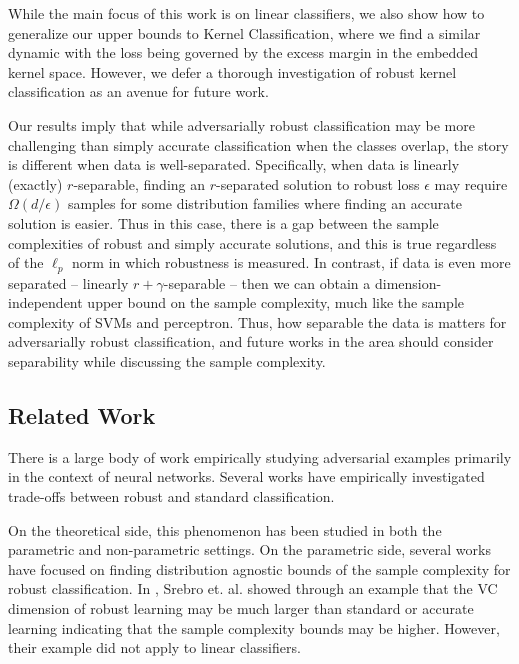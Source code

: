 While the main focus of this work is on linear classifiers, we also show how to generalize our upper bounds to Kernel Classification, where we find a similar dynamic with the loss being governed by the excess margin in the embedded kernel space. However, we defer a thorough investigation of robust kernel classification as an avenue for future work.

Our results imply that while adversarially robust classification may be more challenging than simply accurate classification when the classes overlap, the story is different when data is well-separated. Specifically, when data is linearly (exactly) $r$-separable, finding an $r$-separated solution to robust loss $\epsilon$ may require $\Omega(d/\epsilon)$ samples for some distribution families where finding an accurate solution is easier. Thus in this case, there is a gap between the sample complexities of robust and simply accurate solutions, and this is true regardless of the $\ell_p$ norm in which robustness is measured. In contrast, if data is even more separated -- linearly $r + \gamma$-separable --  then we can obtain a dimension-independent upper bound on the sample complexity, much like the sample complexity of SVMs and perceptron. Thus, how separable the data is matters for adversarially robust classification, and future works in the area should consider separability while discussing the sample complexity.

\subsection{Related Work}

There is a large body of work \cite{Carlini17, Liu17, Papernot17, Papernot16, Szegedy14, Hein17, Katz17, Wu16,Steinhardt18, Sinha18} empirically studying adversarial examples primarily in the context of neural networks. Several works \cite{Schmidt18, Raghunathan20, Tsipras19} have empirically investigated trade-offs between robust and standard classification.

On the theoretical side, this phenomenon has been studied in both the parametric and non-parametric settings. On the parametric side, several works \cite{loh18, attias19, Srebro19, bartlett19, pathak20} have focused on finding distribution agnostic bounds of the sample complexity for robust classification. In \cite{Srebro19}, Srebro et. al. showed through an example that the VC dimension of robust learning may be much larger than standard or accurate learning indicating that the sample complexity bounds may be higher. However, their example did not apply to linear classifiers. 

